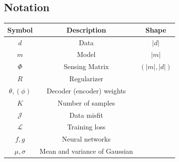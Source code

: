 \documentclass[12pt]{article}
\begin{document}
\subsection{Notation}
\begin{center}
\begin{tabular}{ c | c | c}
 Symbol & Description & Shape \\
 \hline 
 $d$ & Data  & $|d|$ \\  
 $m$ & Model & $|m|$ \\
 $\Phi$ & Sensing Matrix & $(|m|, |d|)$\\
 $R$    & Regularizer  & \\
 $\theta, (\phi)$    & Decoder (encoder) weights & \\
 $ K $ & Number of samples & \\ 	 
 $\mathcal{J}$ & Data misfit & \\
 $\mathcal{L}$ & Training loss & \\ 
 $ f, g $ & Neural networks & \\
 $ \mu, \sigma$ & Mean and variance of Gaussian & 
\end{tabular}
\end{center}
\end{document}
